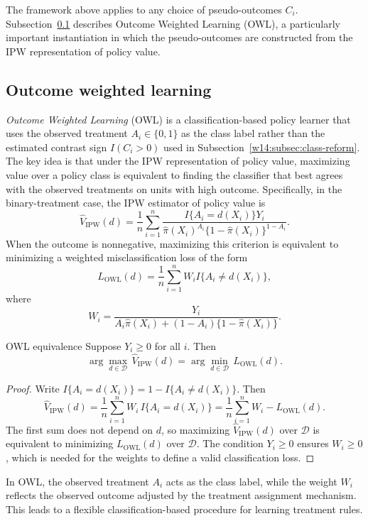 \documentclass[master.tex]{subfiles}
\begin{document}
The framework above applies to any choice of pseudo-outcomes \(C_i\). Subsection~\ref{w14:sec:owl} describes Outcome Weighted Learning (OWL), a particularly important instantiation in which the pseudo-outcomes are constructed from the IPW representation of policy value.

\subsection{Outcome weighted learning}
\label{w14:sec:owl}

\emph{Outcome Weighted Learning} (OWL) \citep{zhao2012estimating} is a
classification-based policy learner that uses the observed treatment
\(A_i\in\{0,1\}\) as the class label rather than the estimated contrast sign
\(I(C_i>0)\) used in Subsection~\ref{w14:subsec:class-reform}. The key idea is
that under the IPW representation of policy value, maximizing value over a
policy class is equivalent to finding the classifier that best agrees with
the observed treatments on units with high outcome. Specifically, in the
binary-treatment case, the IPW estimator of policy value is
\[
\widehat V_{\mathrm{IPW}}(d)
=
\frac{1}{n}\sum_{i=1}^n
\frac{I\{A_i=d(X_i)\}Y_i}{\hat\pi(X_i)^{A_i}\{1-\hat\pi(X_i)\}^{1-A_i}}.
\]
When the outcome is nonnegative, maximizing this criterion is equivalent to minimizing a weighted misclassification loss of the form
\[
L_{\mathrm{OWL}}(d)
=
\frac{1}{n}\sum_{i=1}^n
W_i I\{A_i\neq d(X_i)\},
\]
where
\[
W_i=
\frac{Y_i}{A_i\hat\pi(X_i)+(1-A_i)\{1-\hat\pi(X_i)\}}.
\]

\begin{prop}{OWL equivalence}
\label{w14:prop:owl-equiv}
Suppose \(Y_i\geq 0\) for all \(i\). Then
\[
\arg\max_{d\in\mathcal D}\,\widehat V_{\mathrm{IPW}}(d)
=
\arg\min_{d\in\mathcal D}\,L_{\mathrm{OWL}}(d).
\]
\end{prop}

\begin{proof}
Write \(I\{A_i=d(X_i)\}=1-I\{A_i\neq d(X_i)\}\). Then
\[
\widehat V_{\mathrm{IPW}}(d)
=
\frac{1}{n}\sum_{i=1}^n W_i\,I\{A_i=d(X_i)\}
=
\frac{1}{n}\sum_{i=1}^n W_i
-
L_{\mathrm{OWL}}(d).
\]
The first sum does not depend on \(d\), so maximizing
\(\widehat V_{\mathrm{IPW}}(d)\) over \(\mathcal D\) is equivalent to
minimizing \(L_{\mathrm{OWL}}(d)\) over \(\mathcal D\). The condition
\(Y_i\geq 0\) ensures \(W_i\geq 0\), which is needed for the weights to
define a valid classification loss.
\end{proof}

\begin{remark}
In OWL, the observed treatment \(A_i\) acts as the class label, while the weight \(W_i\) reflects the observed outcome adjusted by the treatment assignment mechanism. This leads to a flexible classification-based procedure for learning treatment rules.
\end{remark}
\end{document}
